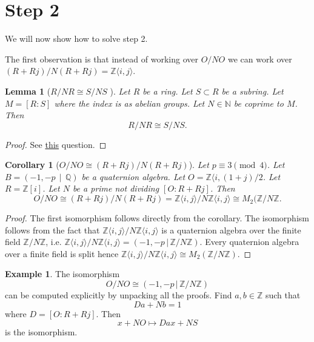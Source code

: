 \documentclass[10pt]{article}
\theoremstyle{plain}
\newtheorem{lemma}[theorem]{Lemma}
\newtheorem{corollary}[theorem]{Corollary}
\theoremstyle{definition}
\newtheorem{example}[theorem]{Example}
\newcommand{\iso}{\cong}
\newcommand{\N}{\mathbb{N}}
\newcommand{\Z}{\mathbb{Z}}
\newcommand{\Q}{\mathbb{Q}}
\begin{document}
\section{Step 2}

We will now show how to solve step 2.

The first observation is that instead of working over \( O / NO \) we can work over \( (R+Rj) / N(R+Rj) = \Z \langle i, j \rangle \).

\begin{lemma}[\( R/ NR \iso S / NS \) ]
    Let \( R \) be a ring.
    Let \( S \subset R \) be a subring.
    Let \( M = [R : S] \) where the index is as abelian groups.
    Let \( N \in \N \) be coprime to \( M \).
    Then
    \[
        R / NR \iso S / NS.
    \]
\end{lemma}
\begin{proof}
    See \href{https://math.stackexchange.com/questions/387931/fracsms-is-isomorphic-to-fracrmr-where-m-is-coprime-to-n}{this} question.
\end{proof}

\begin{corollary}[\( O / NO \iso (R + Rj) / N(R + Rj)\)]
    Let \( p \equiv 3 \pmod{4} \).
    Let \( B =  (-1, -p \, \mid \, \Q) \) be a quaternion algebra.
    Let \( O = \Z \langle i, (1+j) / 2 \).
    Let \( R = \Z[i] \).
    Let \( N \) be a prime not dividing \( [O : R + Rj] \).
    Then
    \[
        O / NO \iso (R + Rj) / N(R + Rj) = \Z \langle i, j \rangle / N \Z \langle i, j \rangle \iso M_2(\Z / N\Z.
    \]
\end{corollary}
\begin{proof}
    The first isomorphism follows directly from the corollary.
    The isomorphism follows from the fact that \( \Z \langle i, j \rangle / N \Z \langle i, j \rangle \) is a quaternion algebra over the finite field \( \Z / N \Z \), i.e. \( \Z \langle i, j \rangle / N \Z \langle i, j \rangle = (-1, -p \, | \, \Z / N \Z ) \).
    Every quaternion algebra over a finite field is split hence \( \Z \langle i, j \rangle / N \Z \langle i, j \rangle \iso M_2(\Z / N \Z) \).
\end{proof}

\begin{example}
    The isomorphism
    \[
        O / NO \iso (-1, -p \, | \, \Z / N\Z)
    \]
    can be computed explicitly by unpacking all the proofs.
    Find \( a, b \in \Z \) such that
    \[
        Da + Nb = 1
    \]
    where \( D = [O : R + Rj] \).
    Then
    \[
        x + NO \mapsto Dax + NS
    \]
    is the isomorphism.
\end{example}
\end{document}
